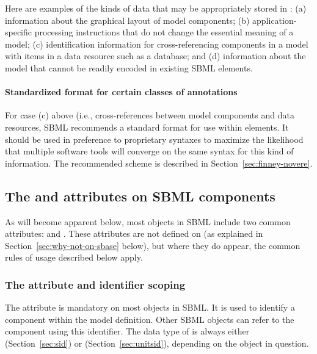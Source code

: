 Here are examples of the kinds of data that may be appropriately
stored in : (a) information about the graphical
layout of model components; (b) application-specific processing
instructions that do not change the essential meaning of a model;
(c) identification information for cross-referencing components in
a model with items in a data resource such as a database;
  and (d) information about the model that cannot be
  readily encoded in existing SBML elements.


\paragraph{Standardized format for certain classes of annotations}

For case (c) above (i.e., cross-references between model
components and data resources\changed{)}, SBML \thisLV recommends a
standard format for use within 
elements.  It should be used in preference to
proprietary syntaxes to maximize the likelihood that multiple
software tools will converge on the same syntax for this kind of
information.  The recommended scheme is described in
Section~\ref{sec:finney-novere}.


\subsection{The  and  attributes on SBML components}
\label{sec:idnameattribs}

As will become apparent below, most objects in SBML include two
common attributes:  and .  These attributes are not
defined on \SBase (as explained in
Section~\ref{sec:why-not-on-sbase} below), but where they do
appear, the common rules of usage described below apply.


\subsubsection{The  attribute and identifier scoping}
\label{sec:identifiers}

The  attribute is mandatory on most objects in
SBML.  It is used to identify a component within the model
definition.  Other SBML objects can refer to the component
using this identifier.  The data type of  is always
either  (Section~\ref{sec:sid}) or
 (Section~\ref{sec:unitsid}), depending on the
object in question.

